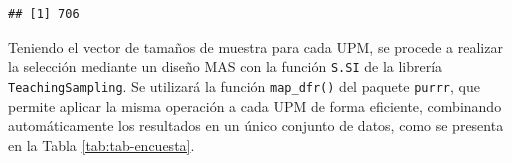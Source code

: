 \documentclass[
  spanish,
  12pt,
]{book}
\newenvironment{Shaded}{\begin{snugshade}}{\end{snugshade}}
\newcommand{\AttributeTok}[1]{\textcolor[rgb]{0.13,0.29,0.53}{#1}}
\newcommand{\ControlFlowTok}[1]{\textcolor[rgb]{0.13,0.29,0.53}{\textbf{#1}}}
\newcommand{\DecValTok}[1]{\textcolor[rgb]{0.00,0.00,0.81}{#1}}
\newcommand{\FloatTok}[1]{\textcolor[rgb]{0.00,0.00,0.81}{#1}}
\newcommand{\FunctionTok}[1]{\textcolor[rgb]{0.13,0.29,0.53}{\textbf{#1}}}
\newcommand{\NormalTok}[1]{#1}
\newcommand{\OtherTok}[1]{\textcolor[rgb]{0.56,0.35,0.01}{#1}}
\newcommand{\SpecialCharTok}[1]{\textcolor[rgb]{0.81,0.36,0.00}{\textbf{#1}}}
\begin{document}
\begin{Shaded}
\end{Shaded}

\begin{verbatim}
## [1] 706
\end{verbatim}

Teniendo el vector de tamaños de muestra para cada UPM, se procede a realizar la selección mediante un diseño MAS con la función \texttt{S.SI} de la librería \texttt{TeachingSampling}. Se utilizará la función \texttt{map\_dfr()} del paquete \texttt{purrr}, que permite aplicar la misma operación a cada UPM de forma eficiente, combinando automáticamente los resultados en un único conjunto de datos, como se presenta en la Tabla \ref{tab:tab-encuesta}.

\begin{Shaded}
\end{Shaded}
\end{document}

